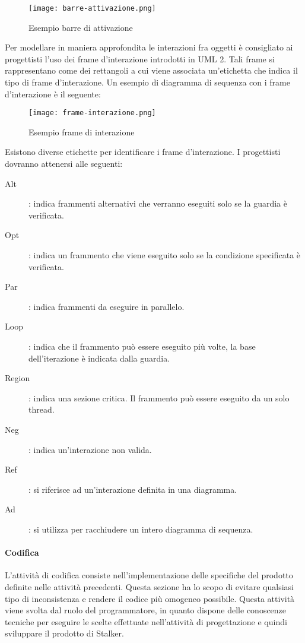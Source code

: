 \documentclass[../../norme-di-progetto.tex]{subfiles}
\begin{document}
\begin{figure}[H]%
  \label{fig:barre_attivazione}
  \texttt{[image: barre-attivazione.png]}
  \centering
  \caption{Esempio barre di attivazione}
\end{figure}
Per modellare in maniera approfondita le interazioni fra oggetti è consigliato ai progettisti l'uso dei frame d'interazione introdotti in UML 2. Tali frame si rappresentano come dei rettangoli a cui viene associata un'etichetta che indica il tipo di frame d'interazione. Un esempio di diagramma di sequenza con i frame d'interazione è il seguente:
\begin{figure}[H]%
  \label{fig:frame_di_interazione}
  \texttt{[image: frame-interazione.png]}
  \centering
  \caption{Esempio frame di interazione}
\end{figure}
Esistono diverse etichette per identificare i frame d'interazione. I progettisti dovranno attenersi alle seguenti:
\begin{description}
  \item [Alt]: indica frammenti alternativi che verranno eseguiti solo se la guardia è verificata.
  \item [Opt]: indica un frammento che viene eseguito solo se la condizione specificata è verificata.
  \item [Par]: indica frammenti da eseguire in parallelo.
  \item [Loop]: indica che il frammento può essere eseguito più volte, la base dell'iterazione è indicata dalla guardia.
  \item [Region]: indica una sezione critica. Il frammento può essere eseguito da un solo thread.
  \item [Neg]: indica un'interazione non valida.
  \item [Ref]: si riferisce ad un'interazione definita in una diagramma.
  \item [Ad]: si utilizza per racchiudere un intero diagramma di sequenza.
\end{description}

\paragraph{Codifica}%
\label{par:codifica}
L'attività di codifica consiste nell'implementazione delle specifiche del prodotto definite nelle attività precedenti.
Questa sezione ha lo scopo di evitare qualsiasi tipo di inconsistenza e rendere il codice più omogeneo possibile.
Questa attività viene svolta dal ruolo del programmatore, in quanto dispone delle conoscenze tecniche per eseguire le scelte effettuate nell'attività di progettazione e quindi sviluppare il prodotto di Stalker.
\end{document}
